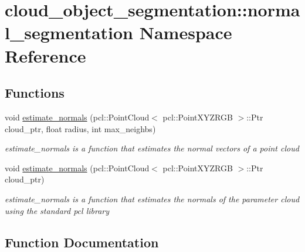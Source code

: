 \hypertarget{namespacecloud__object__segmentation_1_1normal__segmentation}{}\section{cloud\+\_\+object\+\_\+segmentation\+:\+:normal\+\_\+segmentation Namespace Reference}
\label{namespacecloud__object__segmentation_1_1normal__segmentation}
\subsection*{Functions}
\begin{DoxyCompactItemize}
\item 
void \hyperlink{namespacecloud__object__segmentation_1_1normal__segmentation_a10de44c0920a0cdff5df95d8aa6ff2e9}{estimate\+\_\+normals} (pcl\+::\+Point\+Cloud$<$ pcl\+::\+Point\+X\+Y\+Z\+R\+GB $>$\+::Ptr cloud\+\_\+ptr, float radius, int max\+\_\+neighbs)
\begin{DoxyCompactList}\small\item\em estimate\+\_\+normals is a function that estimates the normal vectors of a point cloud \end{DoxyCompactList}\item 
void \hyperlink{namespacecloud__object__segmentation_1_1normal__segmentation_a7c3d9eeca4f978927aaaeda67394382e}{estimate\+\_\+normals} (pcl\+::\+Point\+Cloud$<$ pcl\+::\+Point\+X\+Y\+Z\+R\+GB $>$\+::Ptr cloud\+\_\+ptr)
\begin{DoxyCompactList}\small\item\em estimate\+\_\+normals is a function that estimates the normals of the parameter cloud using the standard pcl library \end{DoxyCompactList}\end{DoxyCompactItemize}


\subsection{Function Documentation}
